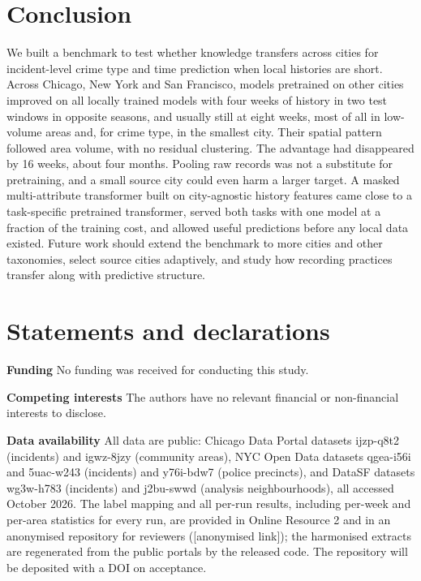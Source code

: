 \documentclass[11pt]{article}
\begin{document}
\section{Conclusion}\label{sec:conclusion}

We built a benchmark to test whether knowledge transfers across cities for incident-level crime type and time prediction when local histories are short. Across Chicago, New York and San Francisco, models pretrained on other cities improved on all locally trained models with four weeks of history in two test windows in opposite seasons, and usually still at eight weeks, most of all in low-volume areas and, for crime type, in the smallest city. Their spatial pattern followed area volume, with no residual clustering. The advantage had disappeared by 16 weeks, about four months. Pooling raw records was not a substitute for pretraining, and a small source city could even harm a larger target. A masked multi-attribute transformer built on city-agnostic history features came close to a task-specific pretrained transformer, served both tasks with one model at a fraction of the training cost, and allowed useful predictions before any local data existed. Future work should extend the benchmark to more cities and other taxonomies, select source cities adaptively, and study how recording practices transfer along with predictive structure.

\section*{Statements and declarations}
\noindent\textbf{Funding} No funding was received for conducting this study.

\noindent\textbf{Competing interests} The authors have no relevant financial or non-financial interests to disclose.

\noindent\textbf{Data availability} All data are public: Chicago Data Portal datasets ijzp-q8t2 (incidents) and igwz-8jzy (community areas), NYC Open Data datasets qgea-i56i and 5uac-w243 (incidents) and y76i-bdw7 (police precincts), and DataSF datasets wg3w-h783 (incidents) and j2bu-swwd (analysis neighbourhoods), all accessed October 2026. The label mapping and all per-run results, including per-week and per-area statistics for every run, are provided in Online Resource 2 and in an anonymised repository for reviewers ([anonymised link]); the harmonised extracts are regenerated from the public portals by the released code. The repository will be deposited with a DOI on acceptance.
\end{document}
